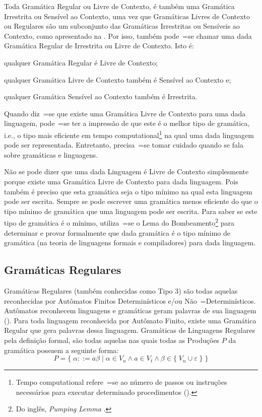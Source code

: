Toda Gramática Regular ou
Livre de Contexto,
é também uma Gramática Irrestrita ou
Sensível ao Contexto,
uma vez que Gramáticas Livres de Contexto ou
Regulares são um subconjunto das Gramáticas Irrestritas ou
Sensíveis ao Contexto,
como apresentado na .
Por isso,
também pode~=se chamar uma dada Gramática Regular de Irrestrita ou
Livre de Contexto.
Isto é:
\begin{inparaenum}[1)]
\item qualquer Gramática Regular é Livre de Contexto;
\item qualquer Gramática Livre de Contexto também é Sensível ao Contexto e;
\item qualquer Gramática Sensível ao Contexto também é Irrestrita.
\end{inparaenum}%

Quando diz~=se que existe uma Gramática Livre de Contexto para uma dada linguagem,
pode~=se ter a impressão de que este é o melhor tipo de gramática,
i.e.,
o tipo mais eficiente em tempo computational\footnote{
Tempo computational refere~=se ao número de passos ou
instruções necessários para executar determinado procedimentos ().
} na qual uma dada linguagem pode ser representada.
Entretanto,
precisa~=se tomar cuidado quando se fala sobre gramáticas e
linguagens.

Não se pode dizer que uma dada Linguagem é Livre de Contexto simplesmente porque existe uma Gramática Livre de Contexto para dada linguagem.
Pois também é preciso que esta gramática seja o tipo mínimo na qual esta linguagem pode ser escrita.
Sempre se pode escrever uma gramática menos eficiente do que o tipo mínimo de gramática que uma linguagem pode ser escrita.
Para saber se este tipo de gramática é o mínimo,
utiliza~=se o Lema do Bombeamento\footnote{
Do inglês,
\textit{Pumping Lemma} \cite{hopcroftBook,sipserBook}.
}
para determinar e
provar formalmente que dada gramática é o tipo mínimo de gramática (na teoria de linguagens formais e
compiladores) para dada linguagem.


\subsection{Gramáticas Regulares}

Gramáticas Regulares (também conhecidas como Tipo 3) são todas aquelas reconhecidas por Autômatos Finitos Determinísticos e\slash{}ou Não~=Determinísticos.
Autômatos reconhecem linguagens e
gramáticas geram palavras de sua linguagem ().
Para toda linguagem reconhecida por Autômato Finito,
existe uma Gramática Regular que gera palavras dessa linguagem.
Gramáticas de Linguagens Regulares pela definição formal,
são todas aquelas nas quais todas as Produções $P$ da gramática possuem a seguinte forma:
$$ P = \{\; \alpha ::= a \beta \;|\; \alpha \in V_n \land a \in V_t
            \land \beta \in \{\; V_n \cup \varepsilon\; \} \;\} $$

